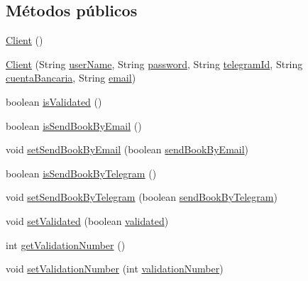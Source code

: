\subsection*{Métodos públicos}
\begin{DoxyCompactItemize}
\item 
\mbox{\hyperlink{classdomain_1_1_client_a9e280dad9c4c0e6dbe0f83186afc765a}{Client}} ()
\item 
\mbox{\hyperlink{classdomain_1_1_client_ae7bf8adbac66187df5b6a5dfd22fba86}{Client}} (String \mbox{\hyperlink{classdomain_1_1_client_a759c4fe989503ceb29bcefca63177186}{user\+Name}}, String \mbox{\hyperlink{classdomain_1_1_client_ad8c3f3e676480cdf083669c007f1e397}{password}}, String \mbox{\hyperlink{classdomain_1_1_client_a48de873a69fd65be53e47b2cbb2c309d}{telegram\+Id}}, String \mbox{\hyperlink{classdomain_1_1_client_a91e08d53a5af62a7822f25c0741b9828}{cuenta\+Bancaria}}, String \mbox{\hyperlink{classdomain_1_1_client_a47341a6cb46fb5c2c61885669070a939}{email}})
\item 
boolean \mbox{\hyperlink{classdomain_1_1_client_aa1343221f2098ed1fa6c41cec0aa59a4}{is\+Validated}} ()
\item 
boolean \mbox{\hyperlink{classdomain_1_1_client_aac608259550fa807f8de3b1e08d30e77}{is\+Send\+Book\+By\+Email}} ()
\item 
void \mbox{\hyperlink{classdomain_1_1_client_acf27654cd7efbc18bb8867a58a272eef}{set\+Send\+Book\+By\+Email}} (boolean \mbox{\hyperlink{classdomain_1_1_client_a7466013d1a12e9d4f7fc739c68bdd238}{send\+Book\+By\+Email}})
\item 
boolean \mbox{\hyperlink{classdomain_1_1_client_aa00c95082f42ebd0bcd252ffa7f5b89b}{is\+Send\+Book\+By\+Telegram}} ()
\item 
void \mbox{\hyperlink{classdomain_1_1_client_af38389540adb7dba2798d6b9912b220f}{set\+Send\+Book\+By\+Telegram}} (boolean \mbox{\hyperlink{classdomain_1_1_client_a303c59a2c1c521a67583268436f3b951}{send\+Book\+By\+Telegram}})
\item 
void \mbox{\hyperlink{classdomain_1_1_client_aef4786d9a92347815e4494c8fc0b8bd2}{set\+Validated}} (boolean \mbox{\hyperlink{classdomain_1_1_client_a2e70a563bf23fd2be7adc13e997363c8}{validated}})
\item 
int \mbox{\hyperlink{classdomain_1_1_client_a423c12788bfb3d265506bad3de79c771}{get\+Validation\+Number}} ()
\item 
void \mbox{\hyperlink{classdomain_1_1_client_a0973728bc4625ebdb83feea51d7de519}{set\+Validation\+Number}} (int \mbox{\hyperlink{classdomain_1_1_client_a1127a9cdf4d8ccff666bec1c9db31e95}{validation\+Number}})

\end{DoxyCompactItemize}
